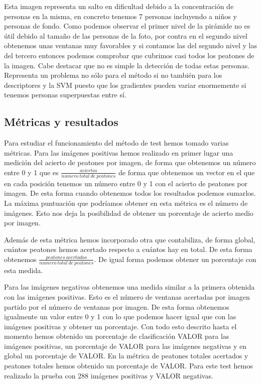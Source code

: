 \documentclass[a4paper,12pt]{article}
\begin{document}
Esta imagen representa un salto en dificultad debido a la concentración de personas en la misma, en concreto tenemos 7 personas incluyendo a niños y personas de fondo. Como podemos observar el primer nivel de la pirámide no es útil debido al tamaño de las personas de la foto, por contra en el segundo nivel obtenemos unas ventanas muy favorables y si contamos las del segundo nivel y las del tercero entonces podemos comprobar que cubrimos casi todos los peatones de la imagen. Cabe destacar que no es simple la detección de todas estas personas. Representa un problema no sólo para el método si no también para los descriptores y la SVM puesto que los gradientes pueden variar enormemente si tenemos personas superpuestas entre sí.

\subsection{Métricas y resultados}

Para estudiar el funcionamiento del método de test hemos tomado varias métricas. Para las imágenes positivas hemos realizado en primer lugar una medición del acierto de peatones por imagen, de forma que obtenemos un número entre 0 y 1 que es $\frac{aciertos}{numero \ total \ de \ peatones}$ de forma que obtenemos un vector en el que en cada posición tenemos un número entre 0 y 1 con el acierto de peatones por imagen. De esta forma cuando obtenemos todos los resultados podemos sumarlos. La máxima puntuación que podríamos obtener en esta métrica es el número de imágenes. Esto nos deja la posibilidad de obtener un porcentaje de acierto medio por imagen. 

Además de esta métrica hemos incorporado otra que contabiliza, de forma global, cuántos peatones hemos acertado respecto a cuántos hay en total. De esta forma obtenemos $\frac{peatones \ acertados}{numero \ total \ de \ peatones}$. De igual forma podemos obtener un porcentaje con esta medida.

Para las imágenes negativas obtenemos una medida similar a la primera obtenida con las imágenes positivas. Esto es el número de ventanas acertadas por imagen partido por el número de ventanas por imagen. De esta forma obtenemos igualmente un valor entre 0 y 1 con lo que podemos hacer igual que con las imágenes positivas y obtener un porcentaje. 
Con todo esto descrito hasta el momento hemos obtenido un porcentaje de clasificación VALOR para las imágenes positivas, un porcentaje de VALOR para las imágenes negativas y en global un porcentaje de VALOR. En la métrica de peatones totales acertados y peatones totales hemos obtenido un porcentaje de VALOR. Para este test hemos realizado la prueba con 288 imágenes positivas y VALOR negativas. 
\end{document}
